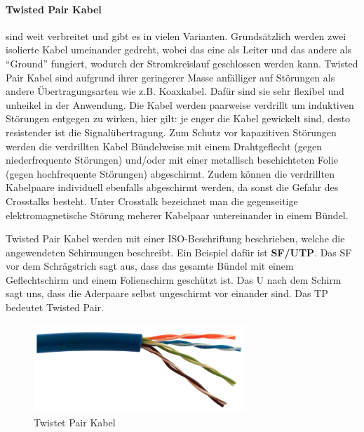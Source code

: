 \documentclass{article}
\begin{document}
\paragraph{Twisted Pair Kabel}
sind weit verbreitet und gibt es in vielen Varianten. Grundsätzlich werden zwei isolierte Kabel umeinander gedreht, wobei das eine als Leiter und das andere als ``Ground'' fungiert, wodurch der Stromkreislauf geschlossen werden kann. Twisted Pair Kabel sind aufgrund ihrer geringerer Masse anfälliger auf Störungen als andere Übertragungsarten wie z.B. Koaxkabel. Dafür sind sie sehr flexibel und unheikel in der Anwendung. Die Kabel werden paarweise verdrillt um induktiven Störungen entgegen zu wirken, hier gilt: je enger die Kabel gewickelt sind, desto resistender ist die Signalübertragung. Zum Schutz vor kapazitiven Störungen werden die verdrillten Kabel Bündelweise mit einem Drahtgeflecht (gegen niederfrequente Störungen) und/oder  mit einer metallisch beschichteten Folie (gegen hochfrequente Störungen) abgeschirmt. Zudem können die verdrillten Kabelpaare individuell ebenfalls abgeschirmt werden, da sonst die Gefahr des Crosstalks besteht. Unter Crosstalk bezeichnet man die gegenseitige elektromagnetische Störung meherer Kabelpaar untereinander in einem Bündel.

Twisted Pair Kabel werden mit einer ISO-Beschriftung beschrieben, welche die angewendeten Schirmungen beschreibt. Ein Beispiel dafür ist \textbf{SF/UTP}. Das SF vor dem Schrägstrich sagt aus, dass das gesamte Bündel mit einem Geflechtschirm und einem Folienschirm geschützt ist. Das U nach dem Schirm sagt uns, dass die Aderpaare selbst ungeschirmt vor einander sind. Das TP bedeutet Twisted Pair. 
\begin{figure}[h!]
		\begin{center}
		\includegraphics[width=8cm]{img/tp.png}
		\end{center}
		\caption{Twistet Pair Kabel}
		\label{fig:Twistet Pair Kabel}
\end{figure}
\end{document}

